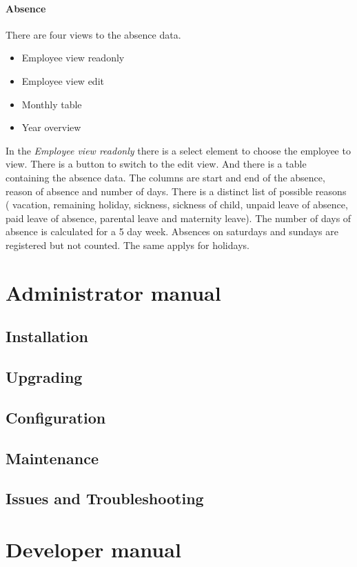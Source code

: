 \documentclass[12pt,a4paper,titlepage]{report}
\begin{document}
\subsubsection{Absence}
There are four views to the absence data.
\begin{itemize}
\item Employee view readonly
\item Employee view edit
\item Monthly table
\item Year overview
\end{itemize}
In the \emph{Employee view readonly} there is a select element to choose the employee to view. There is a button to switch to the edit view.
And there is a table containing the absence data. The columns are start and end of the absence, reason of absence and number of days.
There is a distinct list of possible reasons ( vacation,
        remaining holiday,
       sickness,
        sickness of child,
        unpaid leave of absence,
        paid leave of absence,
        parental leave and
        maternity leave).
The number of days of absence is calculated for a 5 day week. Absences on saturdays and sundays are registered but not counted. The same applys for holidays.


\chapter{Administrator manual}
\section{Installation}
\section{Upgrading}
\section{Configuration}
\section{Maintenance}
\section{Issues and Troubleshooting}


\chapter{Developer manual}
\end{document}
